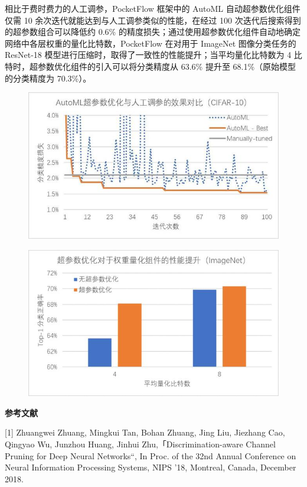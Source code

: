 相比于费时费力的人工调参，PocketFlow 框架中的 AutoML
自动超参数优化组件仅需 10 余次迭代就能达到与人工调参类似的性能，在经过
100 次迭代后搜索得到的超参数组合可以降低约 0.6\%
的精度损失；通过使用超参数优化组件自动地确定网络中各层权重的量化比特数，PocketFlow
在对用于 ImageNet 图像分类任务的 ResNet-18
模型进行压缩时，取得了一致性的性能提升；当平均量化比特数为 4
比特时，超参数优化组件的引入可以将分类精度从 63.6\% 提升至
68.1\%（原始模型的分类精度为 70.3\%）。

\begin{figure}
\centering
\includegraphics{./img/ch17/packflow4.jpg}
\caption{}
\end{figure}

\begin{figure}
\centering
\includegraphics{./img/ch17/packflow5.jpg}
\caption{}
\end{figure}

\textbf{参考文献}

{[}1{]} Zhuangwei Zhuang, Mingkui Tan, Bohan Zhuang, Jing Liu, Jiezhang
Cao, Qingyao Wu, Junzhou Huang, Jinhui Zhu,「Discrimination-aware
Channel Pruning for Deep Neural Networks``, In Proc. of the 32nd Annual
Conference on Neural Information Processing Systems, NIPS '18, Montreal,
Canada, December 2018.

